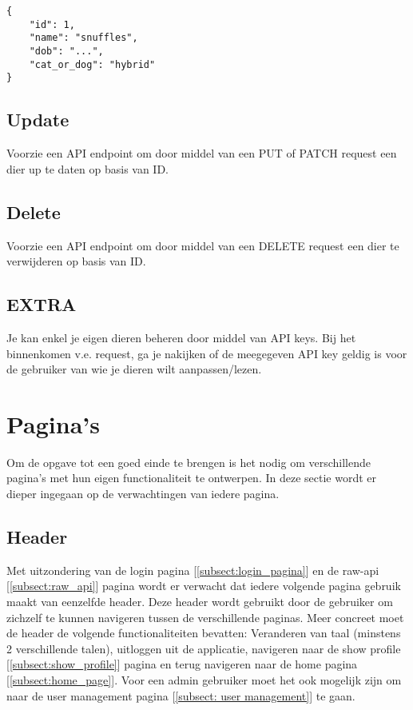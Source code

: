 \documentclass{article}
\begin{document}
\begin{verbatim}
{
    "id": 1,
    "name": "snuffles",
    "dob": "...",
    "cat_or_dog": "hybrid"
}
\end{verbatim}


\subsection{Update}
Voorzie een API endpoint om door middel van een PUT of PATCH request een dier up te daten op basis van ID.

\subsection{Delete}
Voorzie een API endpoint om door middel van een DELETE request een dier te verwijderen op basis van ID.

\subsection{EXTRA}
Je kan enkel je eigen dieren beheren door middel van API keys. Bij het binnenkomen v.e. request, ga je nakijken of de meegegeven API key geldig is voor de gebruiker van wie je dieren wilt aanpassen/lezen.

\section{Pagina's}
Om de opgave tot een goed einde te brengen is het nodig om verschillende pagina's met hun eigen functionaliteit te ontwerpen. In deze sectie wordt er dieper ingegaan op de verwachtingen van iedere pagina.

\subsection{Header}
Met uitzondering van de login pagina [\ref{subsect:login_pagina}] en de raw-api [\ref{subsect:raw_api}] pagina wordt er verwacht dat iedere volgende pagina gebruik maakt van eenzelfde header. Deze header wordt gebruikt door de gebruiker om zichzelf te kunnen navigeren tussen de verschillende paginas. Meer concreet moet de header de volgende functionaliteiten bevatten: Veranderen van taal (minstens 2 verschillende talen), uitloggen uit de applicatie,  navigeren naar de show profile [\ref{subsect:show_profile}] pagina en terug navigeren naar de home pagina [\ref{subsect:home_page}]. Voor een admin gebruiker moet het ook mogelijk zijn om naar de user management pagina [\ref{subsect: user management}] te gaan.
\end{document}
